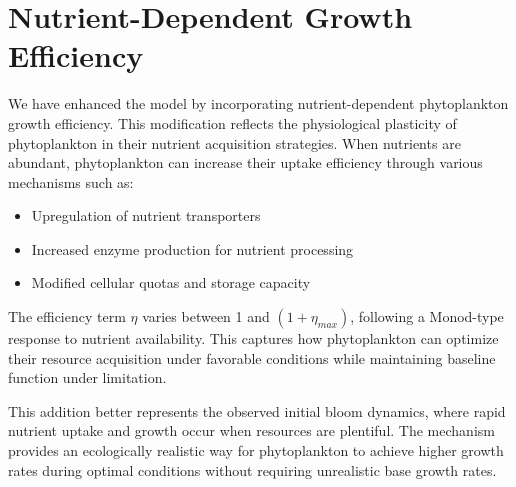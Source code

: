 \section{Nutrient-Dependent Growth Efficiency}

We have enhanced the model by incorporating nutrient-dependent phytoplankton growth efficiency. This modification reflects the physiological plasticity of phytoplankton in their nutrient acquisition strategies. When nutrients are abundant, phytoplankton can increase their uptake efficiency through various mechanisms such as:

\begin{itemize}
\item Upregulation of nutrient transporters
\item Increased enzyme production for nutrient processing
\item Modified cellular quotas and storage capacity
\end{itemize}

The efficiency term $\eta$ varies between 1 and $(1 + \eta_{max})$, following a Monod-type response to nutrient availability. This captures how phytoplankton can optimize their resource acquisition under favorable conditions while maintaining baseline function under limitation.

This addition better represents the observed initial bloom dynamics, where rapid nutrient uptake and growth occur when resources are plentiful. The mechanism provides an ecologically realistic way for phytoplankton to achieve higher growth rates during optimal conditions without requiring unrealistic base growth rates.
